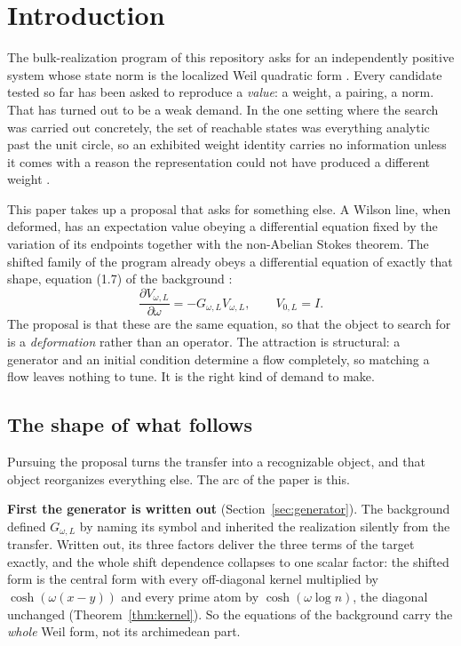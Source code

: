 \section{Introduction}\label{sec:intro}

The bulk-realization program of this repository asks for an independently
positive system whose state norm is the localized Weil quadratic form
\cite{InverseBulk}. Every candidate tested so far has been asked to reproduce a
\emph{value}: a weight, a pairing, a norm. That has turned out to be a weak
demand. In the one setting where the search was carried out concretely, the set
of reachable states was everything analytic past the unit circle, so an exhibited
weight identity carries no information unless it comes with a reason the
representation could not have produced a different weight \cite{Bottleneck}.

This paper takes up a proposal that asks for something else. A Wilson line, when
deformed, has an expectation value obeying a differential equation fixed by the
variation of its endpoints together with the non-Abelian Stokes theorem. The
shifted family of the program already obeys a differential equation of exactly
that shape, equation (1.7) of the background \cite{Background}:
\[
\frac{\partial V_{\omega,L}}{\partial\omega}=-G_{\omega,L}V_{\omega,L},
\qquad V_{0,L}=I .
\]
The proposal is that these are the same equation, so that the object to search
for is a \emph{deformation} rather than an operator. The attraction is
structural: a generator and an initial condition determine a flow completely, so
matching a flow leaves nothing to tune. It is the right kind of demand to make.

\subsection*{The shape of what follows}

Pursuing the proposal turns the transfer into a recognizable object, and that
object reorganizes everything else. The arc of the paper is this.

\textbf{First the generator is written out} (Section~\ref{sec:generator}). The
background defined $G_{\omega,L}$ by naming its symbol and inherited the
realization silently from the transfer. Written out, its three factors deliver
the three terms of the target exactly, and the whole shift dependence collapses
to one scalar factor: the shifted form is the central form with every
off-diagonal kernel multiplied by $\cosh(\omega(x-y))$ and every prime atom by
$\cosh(\omega\log n)$, the diagonal unchanged (Theorem~\ref{thm:kernel}). So the
equations of the background carry the \emph{whole} Weil form, not its archimedean
part.

